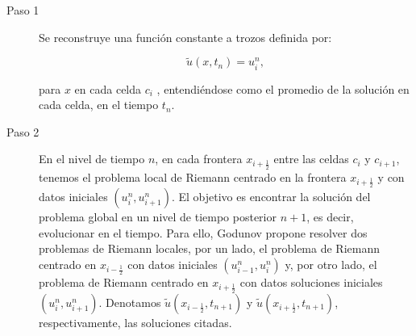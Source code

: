 \begin{description}
  \item[Paso 1]

        Se reconstruye una función constante a trozos definida por:

        \begin{equation*}
          \widetilde{u}
          \left(x,t_{n}\right)=
          u^{n}_{i},
        \end{equation*}

        para $x$ en cada celda $c_{i}$ , entendiéndose como el
        promedio de la solución en cada celda, en el tiempo $t_{n}$.

  \item[Paso 2]

        En el nivel de tiempo $n$, en cada frontera
        $x_{i+\frac{1}{2}}$ entre las celdas $c_{i}$ y $c_{i+1}$,
        tenemos el problema local de Riemann centrado en la frontera
        $x_{i+\frac{1}{2}}$ y con datos iniciales
        \begin{math}
          \left(
          u^{n}_{i},
          u^{n}_{i+1}
          \right)
        \end{math}.
        El objetivo es encontrar la solución del problema global en
        un nivel de tiempo posterior $n+1$, es decir, evolucionar en
        el tiempo.
        Para ello, Godunov propone resolver dos problemas de Riemann
        locales, por un lado, el problema de Riemann centrado en
        $x_{i-\frac{1}{2}}$ con datos iniciales
        \begin{math}
          \left(
          u^{n}_{i-1},u^{n}_{i}
          \right)
        \end{math}
        y, por otro lado, el problema de Riemann centrado en
        $x_{i+\frac{1}{2}}$ con datos soluciones iniciales
        \begin{math}
          \left(
          u^{n}_{i},
          u^{n}_{i+1}
          \right)
        \end{math}.
        Denotamos
        \begin{math}
          \widetilde{u}
          \left(
          x_{i-\frac{1}{2}},
          t_{n+1}
          \right)
        \end{math}
        y
        \begin{math}
          \widetilde{u}
          \left(
          x_{i+\frac{1}{2}},
          t_{n+1}
          \right)
        \end{math},
        respectivamente, las soluciones citadas.


\end{description}
